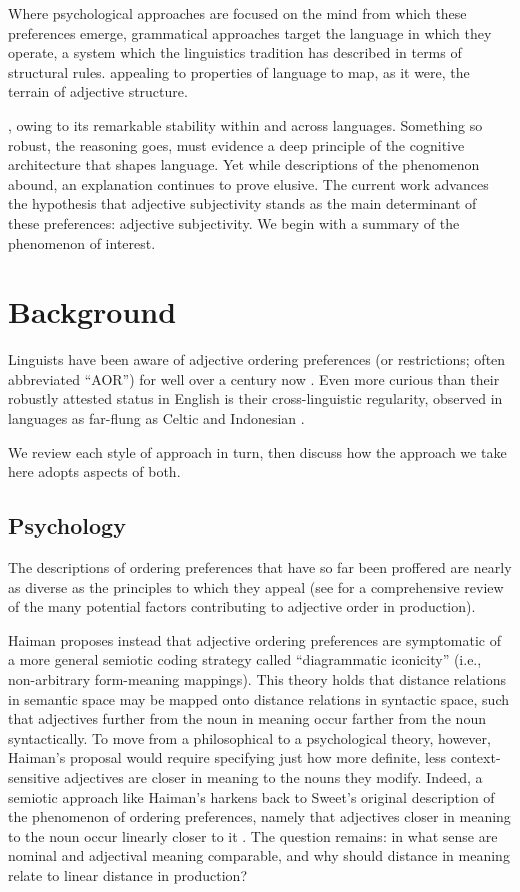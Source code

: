 \documentclass{pnastwo}
\begin{document}
\begin{article}
Where psychological approaches are focused on the mind from which these preferences emerge, grammatical approaches target the language in which they operate, a system which the linguistics tradition has described in terms of structural rules. appealing to properties of language to map, as it were, the terrain of adjective structure.








, owing to its remarkable stability within and across languages. Something so robust, the reasoning goes, must evidence a deep principle of the cognitive architecture that shapes language. Yet while descriptions of the phenomenon abound, an explanation continues to prove elusive. The current work advances the hypothesis that adjective subjectivity stands as the main determinant of these preferences: adjective subjectivity. We begin with a summary of the phenomenon of interest.

\section{Background}
 Linguists have been aware of adjective ordering preferences (or restrictions; often abbreviated ``AOR'') for well over a century now \cite{sweet1898,bloomfield1933}. Even more curious than their robustly attested status in English is their cross-linguistic regularity, observed in languages as far-flung as Celtic \cite{sproatshih1991} and Indonesian \cite{martin1969competence}. 
 
  We review each style of approach in turn, then discuss how the approach we take here adopts aspects of both.
\subsection{Psychology}
The descriptions of ordering preferences that have so far been proffered are nearly as diverse as the principles to which they appeal (see \cite{wulff2003} for a comprehensive review of the many potential factors contributing to adjective order in production). 
 

Haiman \cite{haiman1985} proposes instead that adjective ordering preferences are symptomatic of a more general semiotic coding strategy called ``diagrammatic iconicity'' (i.e., non-arbitrary form-meaning mappings). This theory holds that distance relations in semantic space may be mapped onto distance relations in syntactic space, such that adjectives further from the noun in meaning occur farther from the noun syntactically. To move from a philosophical to a psychological theory, however, Haiman's proposal would require specifying just how more definite, less context-sensitive adjectives are closer in meaning to the nouns they modify. Indeed, a semiotic approach like Haiman's harkens back to Sweet's original description of the phenomenon of ordering preferences, namely that adjectives closer in meaning to the noun occur linearly closer to it \cite{sweet1898}. The question remains: in what sense are nominal and adjectival meaning comparable, and why should distance in meaning relate to linear distance in production?


\end{article}
\end{document}
